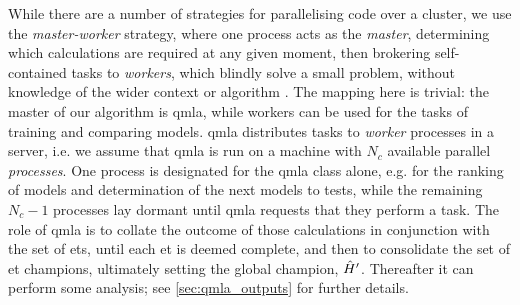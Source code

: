 While there are a number of strategies for parallelising code over a cluster, 
    we use the \emph{master-worker} strategy, where one process acts as the \emph{master}, 
    determining which calculations are required at any given moment, 
    then brokering self-contained tasks to \emph{workers}, 
    which blindly solve a small problem, without knowledge of the wider context or algorithm \cite{hockney2019parallel}.
The mapping here is trivial: the master of our algorithm is \gls{qmla}, 
    while workers can be used for the tasks of training and comparing models. 
\gls{qmla} distributes tasks to \emph{worker} processes in a server, 
    i.e. we assume that \gls{qmla} is run on a machine with $N_c$ available parallel \emph{processes}\footnotemark. 
One process is designated for the \gls{qmla} class alone,
    e.g. for the ranking of models and determination of the next models to tests, 
    while the remaining $N_c - 1$ processes lay dormant until \gls{qmla} requests that they perform a task. 
The role of \gls{qmla} is to collate the outcome of those calculations in conjunction with the set of \glspl{et}, 
    until each \gls{et} is deemed complete, and then to consolidate the set of 
    \gls{et} champions, ultimately setting the global champion, $\hat{H}^{\prime}$. 
Thereafter it can perform some analysis; see \cref{sec:qmla_outputs} for further details. 

